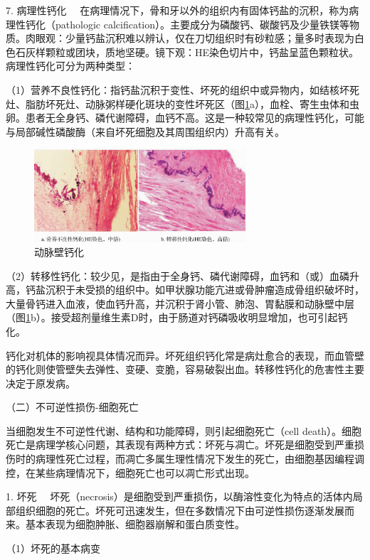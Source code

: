 {7. 病理性钙化}
　在病理情况下，骨和牙以外的组织内有固体钙盐的沉积，称为病理性钙化（pathologic
calcification）。主要成分为磷酸钙、碳酸钙及少量铁镁等物质。肉眼观：少量钙盐沉积难以辨认，仅在刀切组织时有砂粒感；量多时表现为白色石灰样颗粒或团块，质地坚硬。镜下观：HE染色切片中，钙盐呈蓝色颗粒状。病理性钙化可分为两种类型：

（1）营养不良性钙化：指钙盐沉积于变性、坏死的组织中或异物内，如结核坏死灶、脂肪坏死灶、动脉粥样硬化斑块的变性坏死区（图\ref{fig1-12}a），血栓、寄生虫体和虫卵。患者无全身钙、磷代谢障碍，血钙不高。这是一种较常见的病理性钙化，可能与局部碱性磷酸酶（来自坏死细胞及其周围组织内）升高有关。

\begin{figure}[!htbp]
	\centering
    \includegraphics[width=0.7\textwidth]{./images/Image00013.jpg}
	\caption{动脉壁钙化}
	\label{fig1-12} 
	\end{figure} 

（2）转移性钙化：较少见，是指由于全身钙、磷代谢障碍，血钙和（或）血磷升高，钙盐沉积于未受损的组织中。如甲状腺功能亢进或骨肿瘤造成骨组织破坏时，大量骨钙进入血液，使血钙升高，并沉积于肾小管、肺泡、胃黏膜和动脉壁中层（图\ref{fig1-12}b）。接受超剂量维生素D时，由于肠道对钙磷吸收明显增加，也可引起钙化。

钙化对机体的影响视具体情况而异。坏死组织钙化常是病灶愈合的表现，而血管壁的钙化则使管壁失去弹性、变硬、变脆，容易破裂出血。转移性钙化的危害性主要决定于原发病。

{（二）不可逆性损伤-细胞死亡}

当细胞发生不可逆性代谢、结构和功能障碍，则引起细胞死亡（cell
death）。细胞死亡是病理学核心问题，其表现有两种方式：坏死与凋亡。坏死是细胞受到严重损伤时的病理性死亡过程，而凋亡多属生理性情况下发生的死亡，由细胞基因编程调控，在某些病理情况下，细胞死亡也可以凋亡形式出现。

{1. 坏死}
　坏死（necrosis）是细胞受到严重损伤，以酶溶性变化为特点的活体内局部组织细胞的死亡。坏死可迅速发生，但在多数情况下由可逆性损伤逐渐发展而来。基本表现为细胞肿胀、细胞器崩解和蛋白质变性。

（1）坏死的基本病变

